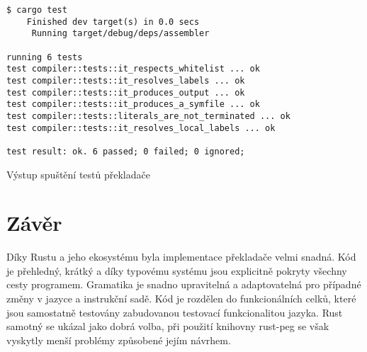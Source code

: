 \begin{listing}
\begin{verbatim}
$ cargo test
    Finished dev target(s) in 0.0 secs
     Running target/debug/deps/assembler

running 6 tests
test compiler::tests::it_respects_whitelist ... ok
test compiler::tests::it_resolves_labels ... ok
test compiler::tests::it_produces_output ... ok
test compiler::tests::it_produces_a_symfile ... ok
test compiler::tests::literals_are_not_terminated ... ok
test compiler::tests::it_resolves_local_labels ... ok

test result: ok. 6 passed; 0 failed; 0 ignored;
\end{verbatim}
\caption{Výstup spuštění testů překladače}
\label{fig:rust-test}
\end{listing}

\section{Závěr}

Díky Rustu a jeho ekosystému byla implementace překladače velmi snadná. Kód je přehledný, krátký a díky typovému systému jsou explicitně pokryty všechny cesty programem. Gramatika je snadno upravitelná a adaptovatelná pro případné změny v jazyce a instrukční sadě. Kód je rozdělen do funkcionálních celků, které jsou samostatně testovány zabudovanou testovací funkcionalitou jazyka. Rust samotný se ukázal jako dobrá volba, při použití knihovny rust-peg se však vyskytly menší problémy způsobené jejím návrhem.
